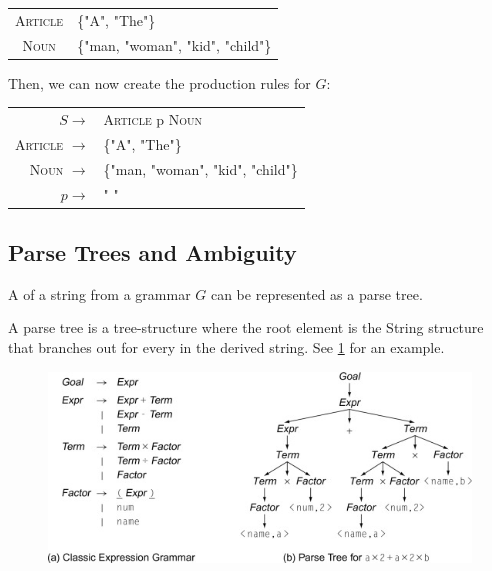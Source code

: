 \begin{center}
    \begin{tabular}{cl}
         \textsc{Article} & \{"A", "The"\}  \\
         \textsc{Noun}    & \{"man, "woman", "kid", "child"\}
    \end{tabular}
\end{center}

Then, we can now create the production rules for $G$:

\begin{center}
    \begin{tabular}{rl}
         $S \to$                & \textsc{Article} p \textsc{Noun} \\
         \textsc{Article} $\to$ & \{"A", "The"\} \\
         \textsc{Noun}    $\to$ & \{"man, "woman", "kid", "child"\}\\
         $p \to$                & " " 
    \end{tabular}
\end{center}

\subsection{Parse Trees and Ambiguity}

A  of a string from a grammar $G$ can be represented as a parse tree.

\begin{defn}
    A parse tree is a tree-structure where the root element is the String structure that branches out for every  in the derived string. See \ref{parse_tree_sample} for an example.
\end{defn}

\begin{figure}
    \centering
    \label{parse_tree_sample}
    \includegraphics[width=0.75\linewidth]{images/parse_tree_sample.jpg}
\end{figure}

